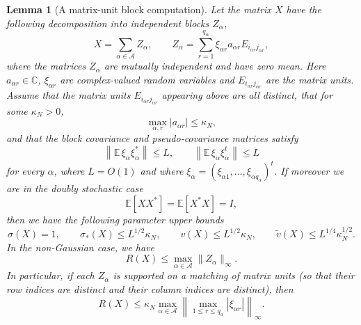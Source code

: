 \documentclass[10pt,a4paper]{amsart}
\theoremstyle{plain}
\newtheorem{lemma}[theorem]{Lemma}
\theoremstyle{remark}
\begin{document}
\begin{lemma}[A matrix-unit block computation]\label{lem:block-parameter}
Let the matrix $X$ have the following decomposition into independent blocks $Z_\alpha$,
\[
X=\sum_{\alpha\in\mathcal A} Z_\alpha,\qquad
Z_\alpha=\sum_{r=1}^{q_\alpha} \xi_{\alpha r} a_{\alpha r}E_{i_{\alpha r}j_{\alpha r}},
\]
where the matrices \(Z_\alpha\) are mutually independent and have zero mean. Here $a_{\alpha r}\in\mathbb{C}$, $\xi_{\alpha r}$ are complex-valued random variables and $E_{i_{\alpha r}j_{\alpha r}}$ are the matrix units. Assume that the
matrix units \(E_{i_{\alpha r}j_{\alpha r}}\) appearing above are all distinct, that for some $\kappa_N>0$,
\[
\max_{\alpha,r}|a_{\alpha r}|\le \kappa_N,
\]
and that the block covariance and pseudo-covariance matrices satisfy
\[
\left\|\mathbb E\,\xi_\alpha\xi_\alpha^*\right\|\le L,
\qquad
\left\|\mathbb E\,\xi_\alpha\xi_\alpha^t\right\|\le L
\]
for every \(\alpha\), where \(L=O(1)\) and where \(\xi_\alpha=(\xi_{\alpha 1},\ldots,\xi_{\alpha q_\alpha})^t\). If moreover we are in the doubly stochastic case
\[
\mathbb E[XX^*]=\mathbb E[X^*X]=I,
\]
then we have the following parameter upper bounds
\begin{equation}
\sigma(X)=1,\qquad
\sigma_*(X)\le L^{1/2}\kappa_N,\qquad
v(X)\le L^{1/2}\kappa_N,\qquad
\widetilde v(X)\le L^{1/4}\kappa_N^{1/2}.
\end{equation}
In the non-Gaussian case, we have
\begin{equation}
R(X)\le \max_{\alpha\in\mathcal A}\|Z_\alpha\|_\infty.
\label{4.2}
\end{equation}
In particular, if each \(Z_\alpha\) is supported on a matching of matrix units (so that their row indices are distinct and their column indices are distinct), then
\begin{equation}
R(X)\le
\kappa_N
\max_{\alpha\in\mathcal A}
\left\|\max_{1\le r\le q_\alpha}|\xi_{\alpha r}|\right\|_\infty .
\label{4.3}
\end{equation}
\end{lemma}
\end{document}
